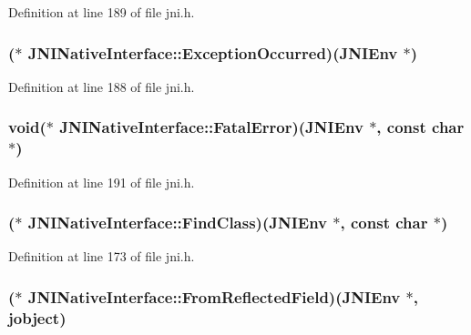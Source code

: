 Definition at line 189 of file jni.\-h.

\hypertarget{struct_j_n_i_native_interface_a5f340cc64a4998ae5414298d93117272}{
\subsubsection[{Exception\-Occurred}]{($\ast$ J\-N\-I\-Native\-Interface\-::\-Exception\-Occurred)({\bf J\-N\-I\-Env} $\ast$)}}\label{struct_j_n_i_native_interface_a5f340cc64a4998ae5414298d93117272}


Definition at line 188 of file jni.\-h.

\hypertarget{struct_j_n_i_native_interface_a927e3aa3cae1ad97b43dde0b94ccf4ff}{
\subsubsection[{Fatal\-Error}]{\setlength{\rightskip}{0pt plus 5cm}void($\ast$ J\-N\-I\-Native\-Interface\-::\-Fatal\-Error)({\bf J\-N\-I\-Env} $\ast$, const char $\ast$)}}\label{struct_j_n_i_native_interface_a927e3aa3cae1ad97b43dde0b94ccf4ff}


Definition at line 191 of file jni.\-h.

\hypertarget{struct_j_n_i_native_interface_a9912828aa8ddc4a6070ea41f1d5f3d08}{
\subsubsection[{Find\-Class}]{($\ast$ J\-N\-I\-Native\-Interface\-::\-Find\-Class)({\bf J\-N\-I\-Env} $\ast$, const char $\ast$)}}\label{struct_j_n_i_native_interface_a9912828aa8ddc4a6070ea41f1d5f3d08}


Definition at line 173 of file jni.\-h.

\hypertarget{struct_j_n_i_native_interface_a2b255910271138a5caf89b618e1e9ca2}{
\subsubsection[{From\-Reflected\-Field}]{($\ast$ J\-N\-I\-Native\-Interface\-::\-From\-Reflected\-Field)({\bf J\-N\-I\-Env} $\ast$, {\bf jobject})}}\label{struct_j_n_i_native_interface_a2b255910271138a5caf89b618e1e9ca2}


